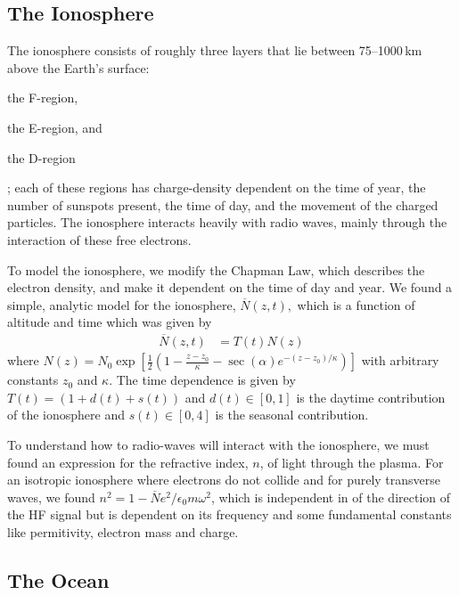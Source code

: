 \documentclass[11pt, twocolumn]{article}
\numberwithin{equation}{section}
\begin{document}
\subsection{The Ionosphere} %
\label{sub:the_ionosphere}

The ionosphere consists of roughly three layers that lie between 75--1000\,km above the Earth's surface:
\begin{enumerate*}[(1)]
    \item the F-region,
    \item the E-region, and
    \item the D-region
\end{enumerate*}; each of these regions has charge-density dependent on the time of year, the number of sunspots present, the time of day, and the movement of the charged particles. The ionosphere interacts heavily with radio waves, mainly through the interaction of these free electrons.\cite{budden1961radio}

To model the ionosphere, we modify the Chapman Law,\cite{chapman1931a,chapman1931b,budden1961radio,budden1988propagation} which describes the electron density, and make it dependent on the time of day and year. We found a simple, analytic model for the ionosphere, $\overline N(z,t),$ which is a function of altitude and time which was given by
\begin{align}
    \overline N(z,t) &= T(t)N(z)
    \label{eq:final_eden}
\end{align}
where $N(z) = N_0\exp\left[\frac12\left(1 - \frac{z-z_0}{\kappa} - \sec(\alpha) e^{- (z - z_0)/\kappa}\right)\right]$ with arbitrary constants $z_0$ and $\kappa$. The time dependence is given by $T(t) = (1 + d(t) + s(t))$ and $d(t) \in [0,1]$ is the daytime contribution of the ionosphere and $s(t)\in[0,4]$ is the seasonal contribution.

To understand how to radio-waves will interact with the ionosphere, we must found  an expression for the refractive index, $n$, of light through the plasma. For an isotropic ionosphere where electrons do not collide and for purely transverse waves, we found $n^2 = 1 - \overline N e^2/\epsilon_0 m \omega^2$, which is independent in of the direction of the HF signal but is dependent on its frequency and some fundamental constants like permitivity, electron mass and charge.

\subsection{The Ocean } %
\label{sub:the_ocean} 
\end{document}
